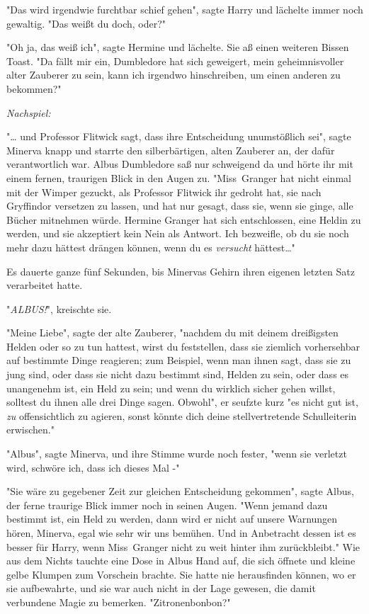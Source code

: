 {"Das wird irgendwie furchtbar schief gehen", sagte Harry und lächelte immer noch gewaltig. "Das weißt du doch, oder?"

"Oh ja, das weiß ich", sagte Hermine und lächelte. Sie aß einen weiteren Bissen Toast. "Da fällt mir ein, Dumbledore hat sich geweigert, mein geheimnisvoller alter Zauberer zu sein, kann ich irgendwo hinschreiben, um einen anderen zu bekommen?"

\emph{Nachspiel:}

"… und Professor Flitwick sagt, dass ihre Entscheidung unumstößlich sei", sagte Minerva knapp und starrte den silberbärtigen, alten Zauberer an, der dafür verantwortlich war. Albus Dumbledore saß nur schweigend da und hörte ihr mit einem fernen, traurigen Blick in den Augen zu. "Miss~Granger hat nicht einmal mit der Wimper gezuckt, als Professor Flitwick ihr gedroht hat, sie nach Gryffindor versetzen zu lassen, und hat nur gesagt, dass sie, wenn sie ginge, alle Bücher mitnehmen würde. Hermine Granger hat sich entschlossen, eine Heldin zu werden, und sie akzeptiert kein Nein als Antwort. Ich bezweifle, ob du sie noch mehr dazu hättest drängen können, wenn du es \emph{versucht} hättest…"

Es dauerte ganze fünf Sekunden, bis Minervas Gehirn ihren eigenen letzten Satz verarbeitet hatte.

"\emph{ALBUS!}", kreischte sie.

"Meine Liebe", sagte der alte Zauberer, "nachdem du mit deinem dreißigsten Helden oder so zu tun hattest, wirst du feststellen, dass sie ziemlich vorhersehbar auf bestimmte Dinge reagieren; zum Beispiel, wenn man ihnen sagt, dass sie zu jung sind, oder dass sie nicht dazu bestimmt sind, Helden zu sein, oder dass es unangenehm ist, ein Held zu sein; und wenn du wirklich sicher gehen willst, solltest du ihnen alle drei Dinge sagen. Obwohl", er seufzte kurz "es nicht gut ist, \emph{zu} offensichtlich zu agieren, sonst könnte dich deine stellvertretende Schulleiterin erwischen."

"Albus", sagte Minerva, und ihre Stimme wurde noch fester, "wenn sie verletzt wird, schwöre ich, dass ich dieses Mal -"

"Sie wäre zu gegebener Zeit zur gleichen Entscheidung gekommen", sagte Albus, der ferne traurige Blick immer noch in seinen Augen. "Wenn jemand dazu bestimmt ist, ein Held zu werden, dann wird er nicht auf unsere Warnungen hören, Minerva, egal wie sehr wir uns bemühen. Und in Anbetracht dessen ist es besser für Harry, wenn Miss~Granger nicht zu weit hinter ihm zurückbleibt." Wie aus dem Nichts tauchte eine Dose in Albus Hand auf, die sich öffnete und kleine gelbe Klumpen zum Vorschein brachte. Sie hatte nie herausfinden können, wo er sie aufbewahrte, und sie war auch nicht in der Lage gewesen, die damit verbundene Magie zu bemerken. "Zitronenbonbon?"

}
